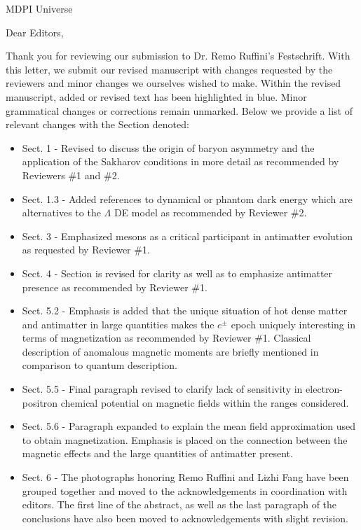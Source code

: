 \documentclass[a4paper, 10pt]{letter}
\begin{document}
\begin{letter}{MDPI Universe}

\opening{Dear Editors,}

Thank you for reviewing our submission to Dr. Remo Ruffini's Festschrift. With this letter, we submit our revised manuscript with changes requested by the reviewers and minor changes we ourselves wished to make. Within the revised manuscript, added or revised text has been highlighted in blue. Minor grammatical changes or corrections remain unmarked. Below we provide a list of relevant changes with the Section denoted:

\begin{itemize}
    \item Sect. 1 - Revised to discuss the origin of baryon asymmetry and the application of the Sakharov conditions in more detail as recommended by Reviewers \#1 and \#2.
    \item Sect. 1.3 - Added references to dynamical or phantom dark energy which are alternatives to the $\Lambda$ DE model as recommended by Reviewer \#2.
    \item Sect. 3 - Emphasized mesons as a critical participant in antimatter evolution as requested by Reviewer \#1.
    \item Sect. 4 - Section is revised for clarity as well as to emphasize antimatter presence as recommended by Reviewer \#1.
    \item Sect. 5.2 - Emphasis is added that the unique situation of hot dense matter and antimatter in large quantities makes the $e^{\pm}$ epoch uniquely interesting in terms of magnetization as recommended by Reviewer \#1. Classical description of anomalous magnetic moments are briefly mentioned in comparison to quantum description.
    \item Sect. 5.5 - Final paragraph revised to clarify lack of sensitivity in electron-positron chemical potential on magnetic fields within the ranges considered.
    \item Sect. 5.6 - Paragraph expanded to explain the mean field approximation used to obtain magnetization. Emphasis is placed on the connection between the magnetic effects and the large quantities of antimatter present.
    \item Sect. 6 - The photographs honoring Remo Ruffini and Lizhi Fang have been grouped together and moved to the acknowledgements in coordination with editors. The first line of the abstract, as well as the last paragraph of the conclusions have also been moved to acknowledgements with slight revision.
\end{itemize}


\end{letter}
\end{document}
